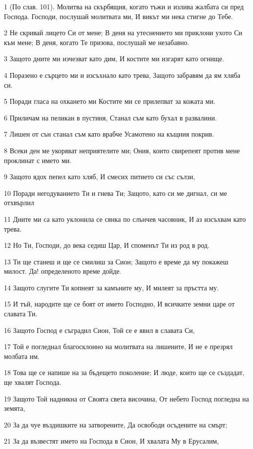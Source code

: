 \par 1 (По слав. 101). Молитва на скърбящия, когато тъжи и излива жалбата си пред Господа. Господи, послушай молитвата ми, И викът ми нека стигне до Тебе.
\par 2 Не скривай лицето Си от мене; В деня на утеснението ми приклони ухото Си към мене; В деня, когато Те призова, послушай ме незабавно.
\par 3 Защото дните ми изчезват като дим, И костите ми изгарят като огнище.
\par 4 Поразено е сърцето ми и изсъхнало като трева, Защото забравям да ям хляба си.
\par 5 Поради гласа на охкането ми Костите ми се прилепват за кожата ми.
\par 6 Приличам на пеликан в пустиня, Станал съм като бухал в развалини.
\par 7 Лишен от сън станал съм като врабче Усамотено на къщния покрив.
\par 8 Всеки ден ме укоряват неприятелите ми; Ония, които свирепеят против мене проклинат с името ми.
\par 9 Защото ядох пепел като хляб, И смесих питието си със сълзи,
\par 10 Поради негодуванието Ти и гнева Ти; Защото, като си ме дигнал, си ме отхвърлил
\par 11 Дните ми са като уклонила се сянка по слънчев часовник, И аз изсъхвам като трева.
\par 12 Но Ти, Господи, до века седиш Цар, И споменът Ти из род в род.
\par 13 Ти ще станеш и ще се смилиш за Сион; Защото е време да му покажеш милост. Да! определеното време дойде.
\par 14 Защото слугите Ти копнеят за камъните му, И милеят за пръстта му.
\par 15 И тъй, народите ще се боят от името Господно, И всичките земни царе от славата Ти.
\par 16 Защото Господ е съградил Сион, Той се е явил в славата Си,
\par 17 Той е погледнал благосклонно на молитвата на лишените, И не е презрял молбата им.
\par 18 Това ще се напише на за бъдещето поколение; И люде, които ще се създадат, ще хвалят Господа.
\par 19 Защото Той надникна от Своята света височина, От небето Господ погледна на земята,
\par 20 За да чуе въздишките на затворените, Да освободи осъдените на смърт;
\par 21 За да възвестят името на Господа в Сион, И хвалата Му в Ерусалим,
